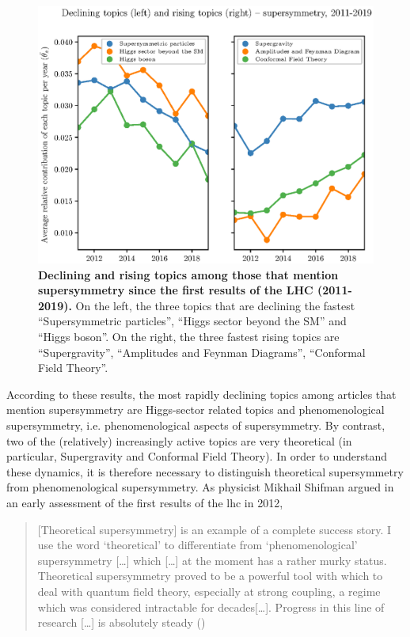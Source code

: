 \documentclass[smallextended]{svjour3}
\begin{document}
\begin{figure}
    \centering
    \includegraphics{Fig5.eps}
    \caption{\textbf{Declining and rising topics among those that mention supersymmetry since the first results of the LHC (2011-2019).} On the left, the three topics that are declining the fastest ``Supersymmetric particles'', ``Higgs sector beyond the SM'' and ``Higgs boson''. On the right, the three fastest rising topics are ``Supergravity'', ``Amplitudes and Feynman Diagrams'', ``Conformal Field Theory''.}
    \label{fig:hot_cold_topics_hep_2011_2019_susy}
\end{figure}

According to these results, the most rapidly declining topics among articles that mention supersymmetry are Higgs-sector related topics and phenomenological supersymmetry, i.e. phenomenological aspects of supersymmetry. By contrast, two of the (relatively) increasingly active topics are very theoretical (in particular, Supergravity and Conformal Field Theory). 
In order to understand these dynamics, it is therefore necessary to distinguish theoretical supersymmetry from phenomenological supersymmetry. As physicist Mikhail Shifman argued in an early assessment of the first results of the \gls{lhc} in 2012, 

\begin{quote}
    [Theoretical supersymmetry] is an example of a complete success story. I use the word ‘theoretical’ to differentiate from ‘phenomenological’ supersymmetry [\dots] which [\dots] at the moment has a rather murky status. Theoretical supersymmetry proved to be a powerful tool with which to deal with quantum field theory, especially at strong coupling, a regime which was considered intractable for decades[\dots]. Progress in this line of research [\dots] is absolutely steady (\citealt[p.~6]{SHIFMAN2012})
\end{quote}
\end{document}
